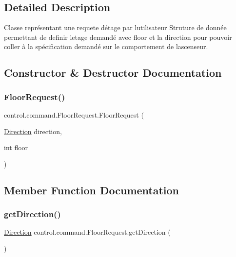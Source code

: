 \subsection{Detailed Description}
Classe représentant une requete d\textquotesingle{}étage par l\textquotesingle{}utilisateur Struture de donnée permettant de definir l\textquotesingle{}etage demandé avec floor et la direction pour pouvoir coller à la spécification demandé sur le comportement de l\textquotesingle{}ascenseur. 

\subsection{Constructor \& Destructor Documentation}
\mbox{\label{classcontrol_1_1command_1_1_floor_request_a03685a59d9f54c5057713039fa580369}} 
\subsubsection{\texorpdfstring{FloorRequest()}{FloorRequest()}}
{\footnotesize\ttfamily control.\+command.\+Floor\+Request.\+Floor\+Request (\begin{DoxyParamCaption}\item[{\mbox{\hyperlink{enumcontrol_1_1command_1_1_direction}{Direction}}}]{direction,  }\item[{int}]{floor }\end{DoxyParamCaption})}



\subsection{Member Function Documentation}
\mbox{\label{classcontrol_1_1command_1_1_floor_request_ad0e7950407e9e15e4a3be8927f1e3408}} 
\subsubsection{\texorpdfstring{getDirection()}{getDirection()}}
{\footnotesize\ttfamily \mbox{\hyperlink{enumcontrol_1_1command_1_1_direction}{Direction}} control.\+command.\+Floor\+Request.\+get\+Direction (\begin{DoxyParamCaption}{ }\end{DoxyParamCaption})}

